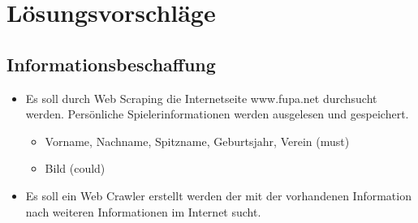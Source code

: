 
\chapter{Lösungsvorschläge}  %
\label{cha:} %
\section{Informationsbeschaffung} %
\begin{itemize}
	\item Es soll durch Web Scraping die Internetseite www.fupa.net durchsucht werden. Persönliche Spielerinformationen werden ausgelesen und gespeichert.
	\begin{itemize}
		\item Vorname, Nachname, Spitzname, Geburtsjahr, Verein (must)
		\item Bild (could)
	\end{itemize}
	\item Es soll ein Web Crawler erstellt werden der mit der vorhandenen Information nach weiteren Informationen im Internet sucht.
\end{itemize}
